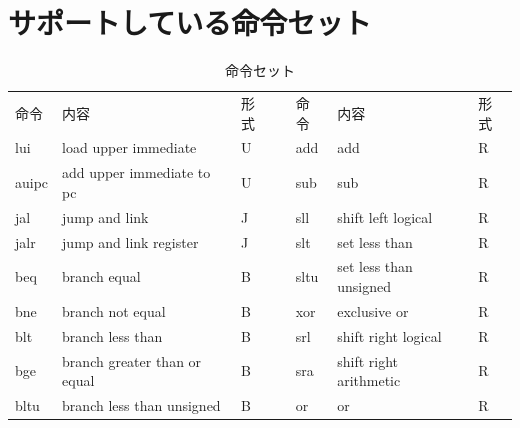 \documentclass[../main.tex]{subfiles}
\begin{document}
  \section{サポートしている命令セット} \label{appendix:isa}
  \begin{table}[h]
    \caption{命令セット}
    \label{table:isa}
    \begin{tabular}{|l|l|l|llll}
    \cline{1-3} \cline{5-7}
    命令    & 内容                                    & 形式 & \multicolumn{1}{l|}{} & \multicolumn{1}{l|}{命令}     & \multicolumn{1}{l|}{内容}                            & \multicolumn{1}{l|}{形式} \\ \cline{1-3} \cline{5-7}
    lui   & load upper immediate                  & U  & \multicolumn{1}{l|}{} & \multicolumn{1}{l|}{add}    & \multicolumn{1}{l|}{add}                           & \multicolumn{1}{l|}{R}  \\
    auipc & add upper immediate to pc             & U  & \multicolumn{1}{l|}{} & \multicolumn{1}{l|}{sub}    & \multicolumn{1}{l|}{sub}                           & \multicolumn{1}{l|}{R}  \\
    jal   & jump and link                         & J  & \multicolumn{1}{l|}{} & \multicolumn{1}{l|}{sll}    & \multicolumn{1}{l|}{shift left logical}            & \multicolumn{1}{l|}{R}  \\
    jalr  & jump and link register                & J  & \multicolumn{1}{l|}{} & \multicolumn{1}{l|}{slt}    & \multicolumn{1}{l|}{set less than}                 & \multicolumn{1}{l|}{R}  \\
    beq   & branch equal                          & B  & \multicolumn{1}{l|}{} & \multicolumn{1}{l|}{sltu}   & \multicolumn{1}{l|}{set less than unsigned}        & \multicolumn{1}{l|}{R}  \\
    bne   & branch not equal                      & B  & \multicolumn{1}{l|}{} & \multicolumn{1}{l|}{xor}    & \multicolumn{1}{l|}{exclusive or}                  & \multicolumn{1}{l|}{R}  \\
    blt   & branch less than                      & B  & \multicolumn{1}{l|}{} & \multicolumn{1}{l|}{srl}    & \multicolumn{1}{l|}{shift right logical}           & \multicolumn{1}{l|}{R}  \\
    bge   & branch greater than or equal          & B  & \multicolumn{1}{l|}{} & \multicolumn{1}{l|}{sra}    & \multicolumn{1}{l|}{shift right arithmetic}        & \multicolumn{1}{l|}{R}  \\
    bltu  & branch less than unsigned             & B  & \multicolumn{1}{l|}{} & \multicolumn{1}{l|}{or}     & \multicolumn{1}{l|}{or}                            & \multicolumn{1}{l|}{R}  \\

\end{tabular}
\end{table}
\end{document}
